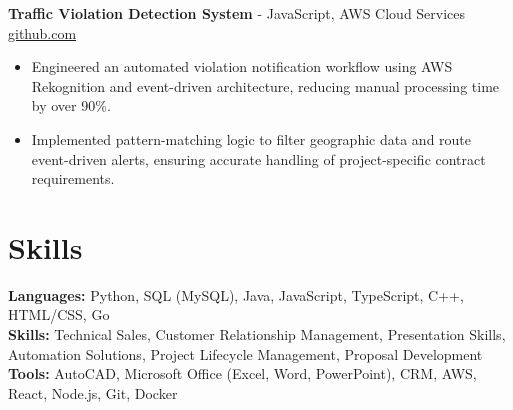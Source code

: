 \documentclass[11pt]{article}       %
\begin{document}
	\textbf{Traffic Violation Detection System}{ - JavaScript, AWS Cloud Services} \hfill \href{https://github.com/Monica20030707/AWS_rekonigition-N-read-database}{github.com} 
\vspace{-9pt}
\begin{itemize}
  \item Engineered an automated violation notification workflow using AWS Rekognition and event-driven architecture, reducing manual processing time by over 90\%.
  \item Implemented pattern-matching logic to filter geographic data and route event-driven alerts, ensuring accurate handling of project-specific contract requirements.
\end{itemize}

\vspace{-18.5pt}

\section*{Skills}
	\textbf{Languages:} Python, SQL (MySQL), Java, JavaScript, TypeScript, C++, HTML/CSS, Go\\
	\textbf{Skills:} Technical Sales, Customer Relationship Management, Presentation Skills, Automation Solutions, Project Lifecycle Management, Proposal Development\\
	\textbf{Tools:} AutoCAD, Microsoft Office (Excel, Word, PowerPoint), CRM, AWS, React, Node.js, Git, Docker\\

\vspace{-6.5pt}
\end{document}
